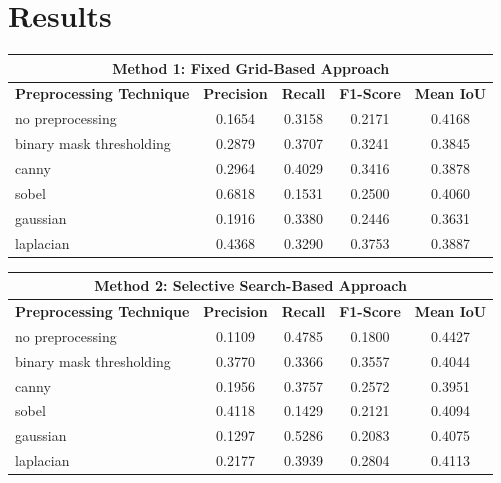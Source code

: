 \documentclass[a4paper,12pt]{article}
\begin{document}
\section{Results}


\begin{table}[ht]
\centering
\begin{tabular}{|l|c|c|c|c|}
\hline
\multicolumn{5}{|c|}{\textbf{Method 1: Fixed Grid-Based Approach}} \\ \hline
\textbf{Preprocessing Technique} & \textbf{Precision} & \textbf{Recall} & \textbf{F1-Score} & \textbf{Mean IoU} \\ \hline
no preprocessing              & 0.1654             & 0.3158          & 0.2171            & 0.4168            \\ \hline
binary mask thresholding            & 0.2879             & 0.3707          & 0.3241            & 0.3845            \\ \hline
canny                 & 0.2964             & 0.4029          & 0.3416            & 0.3878            \\ \hline
sobel                 & 0.6818             & 0.1531          & 0.2500            & 0.4060            \\ \hline
gaussian              & 0.1916             & 0.3380          & 0.2446            & 0.3631            \\ \hline
laplacian             & 0.4368             & 0.3290          & 0.3753            & 0.3887            \\ \hline
\end{tabular}

\vspace{0.5cm}

\begin{tabular}{|l|c|c|c|c|}
\hline
\multicolumn{5}{|c|}{\textbf{Method 2: Selective Search-Based Approach}} \\ \hline
\textbf{Preprocessing Technique} & \textbf{Precision} & \textbf{Recall} & \textbf{F1-Score} & \textbf{Mean IoU} \\ \hline
no preprocessing          & 0.1109             & 0.4785          & 0.1800            & 0.4427            \\ \hline
binary mask thresholding       & 0.3770             & 0.3366          & 0.3557            & 0.4044            \\ \hline
canny             & 0.1956             & 0.3757          & 0.2572            & 0.3951            \\ \hline
sobel             & 0.4118             & 0.1429          & 0.2121            & 0.4094            \\ \hline
gaussian          & 0.1297             & 0.5286          & 0.2083            & 0.4075            \\ \hline
laplacian         & 0.2177             & 0.3939          & 0.2804            & 0.4113            \\ \hline
\end{tabular}
\vspace{0.5cm}


\end{table}
\end{document}
